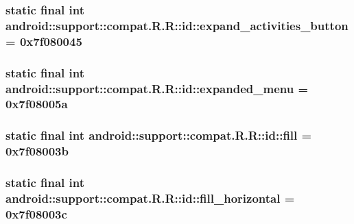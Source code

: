 \hypertarget{classandroid_1_1support_1_1compat_1_1_r_1_1id_599a034bec9af5eb62f56a17a97eb0d8}{
\subsubsection[{expand\_\-activities\_\-button}]{\setlength{\rightskip}{0pt plus 5cm}static final int android::support::compat.R.R::id::expand\_\-activities\_\-button = 0x7f080045}}
\label{classandroid_1_1support_1_1compat_1_1_r_1_1id_599a034bec9af5eb62f56a17a97eb0d8}


\hypertarget{classandroid_1_1support_1_1compat_1_1_r_1_1id_7c8af9d52f5ba30f4a258f08a38c091c}{
\subsubsection[{expanded\_\-menu}]{\setlength{\rightskip}{0pt plus 5cm}static final int android::support::compat.R.R::id::expanded\_\-menu = 0x7f08005a}}
\label{classandroid_1_1support_1_1compat_1_1_r_1_1id_7c8af9d52f5ba30f4a258f08a38c091c}


\hypertarget{classandroid_1_1support_1_1compat_1_1_r_1_1id_3dc4cb7d24abaaa42baecfe286763263}{
\subsubsection[{fill}]{\setlength{\rightskip}{0pt plus 5cm}static final int android::support::compat.R.R::id::fill = 0x7f08003b}}
\label{classandroid_1_1support_1_1compat_1_1_r_1_1id_3dc4cb7d24abaaa42baecfe286763263}


\hypertarget{classandroid_1_1support_1_1compat_1_1_r_1_1id_2b6b756b30529f89ebf41b81b3d7859b}{
\subsubsection[{fill\_\-horizontal}]{\setlength{\rightskip}{0pt plus 5cm}static final int android::support::compat.R.R::id::fill\_\-horizontal = 0x7f08003c}}
\label{classandroid_1_1support_1_1compat_1_1_r_1_1id_2b6b756b30529f89ebf41b81b3d7859b}


